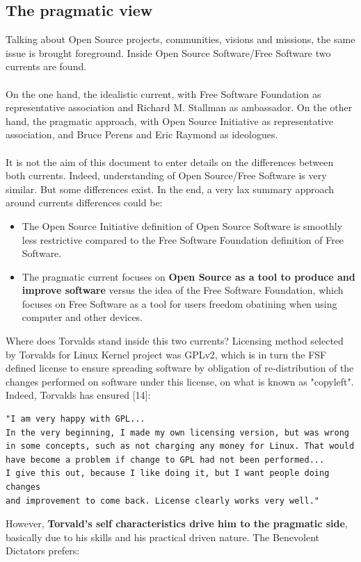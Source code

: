 \documentclass[11pt]{article}
\begin{document}
\subsection{The pragmatic view}
Talking about Open Source projects, communities, visions and missions, the same issue is brought foreground. Inside Open Source Software/Free Software two currents are found.\\
\\
On the one hand, the idealistic current, with Free Software Foundation as representative association and Richard M. Stallman as ambassador.
On the other hand, the pragmatic approach, with Open Source Initiative as representative association, and Bruce Perens and Eric Raymond as ideologues.\\
\\
It is not the aim of this document to enter details on the differences between both currents. Indeed, understanding of Open Source/Free Software is very similar. But some differences exist. In the end, a very lax summary approach around currents differences could be:
\begin{itemize}\itemsep0pt
\item{The Open Source Initiative definition of Open Source Software is smoothly less restrictive compared to the Free Software Foundation definition of Free Software.}
\item{The pragmatic current focuses on \textbf{Open Source as a tool to produce and improve software} versus the idea of the Free Software Foundation, which focuses on Free Software as a tool for users freedom obatining when using computer and other devices.}
\end{itemize}
Where does Torvalds stand inside this two currents? Licensing method selected by Torvalds for Linux Kernel project was GPLv2, which is in turn the FSF defined license to ensure spreading software by obligation of re-distribution of the changes performed on software under this license, on what is known as "copyleft". Indeed, Torvalds has ensured [14]:
\begin{verbatim}
"I am very happy with GPL...
In the very beginning, I made my own licensing version, but was wrong 
in some concepts, such as not charging any money for Linux. That would 
have become a problem if change to GPL had not been performed...
I give this out, because I like doing it, but I want people doing changes 
and improvement to come back. License clearly works very well."
\end{verbatim}
However, \textbf{Torvald's self characteristics drive him to the pragmatic side}, basically due to his skills and his practical driven nature. The Benevolent Dictators prefers:
\end{document}
